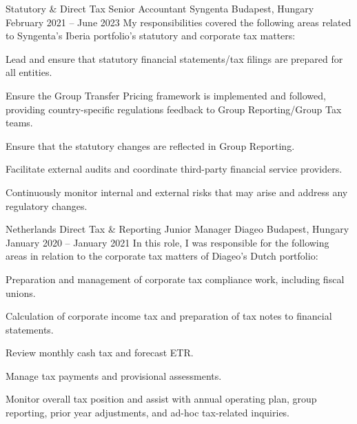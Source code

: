 \begin{cventries}
  \cventry
    {Statutory \& Direct Tax Senior Accountant} %
    {Syngenta} %
    {Budapest, Hungary} %
    {February 2021 -- June 2023} %
    {My responsibilities covered the following areas related to Syngenta's Iberia portfolio's statutory and corporate tax matters:} %
    {
      \begin{cvitems} %
        \item {Lead and ensure that statutory financial statements/tax filings are prepared for all entities.}
        \item {Ensure the Group Transfer Pricing framework is implemented and followed, providing country-specific regulations feedback to Group Reporting/Group Tax teams.}
        \item {Ensure that the statutory changes are reflected in Group Reporting.}
        \item {Facilitate external audits and coordinate third-party financial service providers.}
        \item {Continuously monitor internal and external risks that may arise and address any regulatory changes.}
      \end{cvitems}
    }


  \cventry
    {Netherlands Direct Tax \& Reporting Junior Manager} %
    {Diageo} %
    {Budapest, Hungary} %
    {January 2020 -- January 2021} %
    {In this role, I was responsible for the following areas in relation to the corporate tax matters of Diageo's Dutch portfolio:} %
    {
      \begin{cvitems} %
        \item {Preparation and management of corporate tax compliance work, including fiscal unions.}
        \item {Calculation of corporate income tax and preparation of tax notes to financial statements.}
        \item {Review monthly cash tax and forecast ETR.}
        \item {Manage tax payments and provisional assessments.}
        \item {Monitor overall tax position and assist with annual operating plan, group reporting, prior year adjustments, and ad-hoc tax-related inquiries.}
      \end{cvitems}
    }


\end{cventries}
